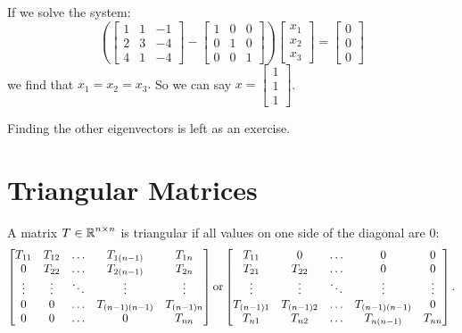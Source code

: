If we solve the system: \[\left(\begin{bmatrix}1&1&-1\\2&3&-4\\4&1&-4\end{bmatrix}-\begin{bmatrix}1&0&0\\0&1&0\\0&0&1\end{bmatrix}\right)\begin{bmatrix}x_1\\x_2\\x_3\end{bmatrix}=\begin{bmatrix}0\\0\\0\end{bmatrix}\] we find that $x_1=x_2=x_3.$ So we can say $x=\begin{bmatrix}1\\1\\1\end{bmatrix}$.

Finding the other eigenvectors is left as an exercise. 

\section{Triangular Matrices}
A matrix $T\in\operatorname{\mathbb{R}}^{n\times n}$ is triangular if all values on one side of the diagonal are 0:
\[
\begin{bmatrix}
T_{11} & T_{12} & \hdots & T_{1(n-1)} & T_{1n}\\
0 & T_{22} & \hdots & T_{2(n-1)} & T_{2n}\\
\vdots & \vdots & \ddots & \vdots & \vdots\\
0 & 0 & \hdots & T_{(n-1)(n-1)} & T_{(n-1)n}\\
0 & 0 & \hdots & 0 & T_{nn}\\
\end{bmatrix}
\textnormal{or} 
\begin{bmatrix}
T_{11} & 0 & \hdots & 0 & 0 \\
T_{21} & T_{22} & \hdots & 0 & 0\\
\vdots & \vdots & \ddots & \vdots & \vdots\\
T_{(n-1)1} & T_{(n-1)2} & \hdots & T_{(n-1)(n-1)} &0\\
T_{n1} & T_{n2} & \hdots & T_{n(n-1)} & T_{nn}\\
\end{bmatrix}.
\]

